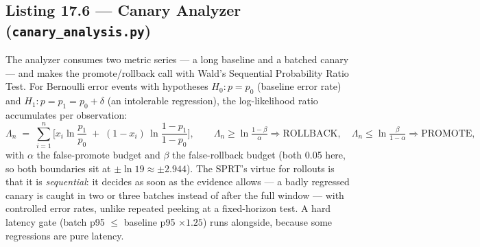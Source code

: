 \subsection{Listing 17.6 --- Canary Analyzer (\texttt{canary\_analysis.py})}
\label{sec:ch17-canary}
\label{lst:ch17-canary}

The analyzer consumes two metric series --- a long baseline and a
batched canary --- and makes the promote/rollback call with Wald's
Sequential Probability Ratio Test. For Bernoulli error events with
hypotheses $H_0: p = p_0$ (baseline error rate) and $H_1: p = p_1 = p_0 +
\delta$ (an intolerable regression), the log-likelihood ratio accumulates
per observation:
\[
\Lambda_n \;=\; \sum_{i=1}^{n} \Big[ x_i \ln\frac{p_1}{p_0} \;+\; (1 -
x_i)\,\ln\frac{1-p_1}{1-p_0} \Big], \qquad
\Lambda_n \ge \ln\tfrac{1-\beta}{\alpha} \Rightarrow \text{ROLLBACK},
\quad
\Lambda_n \le \ln\tfrac{\beta}{1-\alpha} \Rightarrow \text{PROMOTE},
\]
with $\alpha$ the false-promote budget and $\beta$ the false-rollback
budget (both 0.05 here, so both boundaries sit at $\pm\ln 19 \approx
\pm 2.944$). The SPRT's virtue for rollouts is that it is
\emph{sequential}: it decides as soon as the evidence allows --- a badly
regressed canary is caught in two or three batches instead of after the
full window --- with controlled error rates, unlike repeated peeking at a
fixed-horizon test. A hard latency gate (batch p95 $\le$ baseline p95
$\times 1.25$) runs alongside, because some regressions are pure latency.

